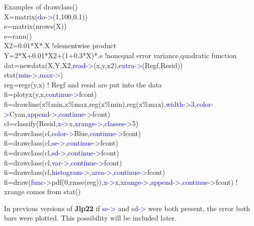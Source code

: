 \begin{example}[drawclassex]Examples of \textcolor{VioletRed}{drawclass}()\\
\label{drawclassex}
X=\textcolor{VioletRed}{matrix}(\textcolor{blue}{do->}(1,100,0.1))\\
e=\textcolor{VioletRed}{matrix}(\textcolor{VioletRed}{nrows}(X))\\
e=\textcolor{VioletRed}{rann}()\\
X2=0.01*X*.X !elementwise product\\
Y=2*X+0.01*X2+(1+0.3*X)*.e  !nonequal error variance,quadratic function\\
dat=\textcolor{VioletRed}{newdata}(X,Y,X2,\textcolor{blue}{read->}(x,y,x2),\textcolor{blue}{extra->}(Regf,Resid))\\
\textcolor{VioletRed}{stat}(\textcolor{blue}{min->},\textcolor{blue}{max->})\\
reg=\textcolor{VioletRed}{regr}(y,x) ! Regf and resid are put into the data\\
fi=\textcolor{VioletRed}{plotyx}(y,x,\textcolor{blue}{continue->}fcont)\\
fi=\textcolor{VioletRed}{drawline}(x\%min,x\%max,reg(x\%min),reg(x\%max),\textcolor{blue}{width->}3,\textcolor{blue}{color->}Cyan,\textcolor{blue}{append->},\textcolor{blue}{continue->}fcont)\\
cl=\textcolor{VioletRed}{classify}(Resid,\textcolor{blue}{x->}x,\textcolor{blue}{xrange->},\textcolor{blue}{classes->}5)\\
fi=\textcolor{VioletRed}{drawclass}(cl,\textcolor{blue}{color->}Blue,\textcolor{blue}{continue->}fcont)\\
fi=\textcolor{VioletRed}{drawclass}(cl,\textcolor{blue}{se->},\textcolor{blue}{continue->}fcont)\\
fi=\textcolor{VioletRed}{drawclass}(cl,\textcolor{blue}{sd->},\textcolor{blue}{continue->}fcont)\\
fi=\textcolor{VioletRed}{drawclass}(cl,\textcolor{blue}{var->},\textcolor{blue}{continue->}fcont)\\
fi=\textcolor{VioletRed}{drawclass}(cl,\textcolor{blue}{histogram->},\textcolor{blue}{area->},\textcolor{blue}{continue->}fcont)\\
fi=\textcolor{VioletRed}{draw}(\textcolor{blue}{func->}\textcolor{VioletRed}{pdf}(0,\textcolor{VioletRed}{rmse}(reg)),\textcolor{blue}{x->}x,\textcolor{blue}{xrange->},\textcolor{blue}{append->},\textcolor{blue}{continue->}fcont) ! xrange comes from \textcolor{VioletRed}{stat}()
\end{example}
\begin{note}
In previous versions of \textbf{Jlp22} if \textcolor{blue}{se->} and \textcolor{blue}{sd->} were both present, the error
both bars were plotted. This possibility will be included later.
\end{note}
